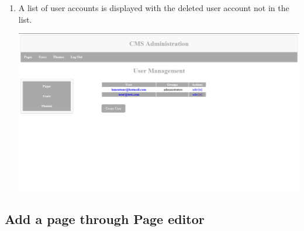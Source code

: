 \documentclass[12pt]{article}
\begin{document}
\begin{enumerate}
  \item A list of user accounts is displayed with the deleted user account not in the list.
  
  \includegraphics[width=\textwidth,height=\textheight,keepaspectratio]{pics/deleteUser_4.png}
  
  
\end{enumerate}

\subsection{Add a page through Page editor}
\end{document}
